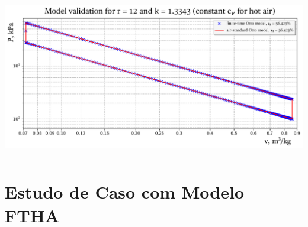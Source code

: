    \begin{frame}{}\vspace*{-2em}
        \begin{center}
            \noindent\hspace*{-3.0mm}\includegraphics[height=70.0mm]{fig/val_r=12,0_k=1,334.pdf}
        \end{center}
    \end{frame}

\section{Estudo de Caso com Modelo FTHA}

